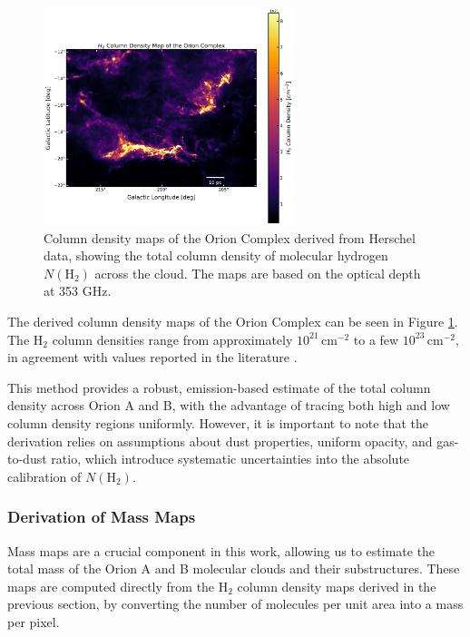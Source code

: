 \begin{figure}[t]
    \centering
    \includegraphics[width=0.65\textwidth]{figures/column_density_map.png}
    \caption{Column density maps of the Orion Complex derived from Herschel data, showing the total column density of molecular hydrogen $N(\mathrm{H}_2)$ across the cloud. The maps are based on the optical depth at 353 GHz.}
    \label{fig:n_h2_final_map}
\end{figure}

The derived column density maps of the Orion Complex can be seen in Figure \ref{fig:n_h2_final_map}. The $\mathrm{H}_2$ column densities range from approximately $10^{21}\,\mathrm{cm}^{-2}$ to a few $10^{23}\,\mathrm{cm}^{-2}$, 
in agreement with values reported in the literature \cite{lombardi2014herschel}.

This method provides a robust, emission-based estimate of the total column density across Orion A and B, with the advantage of tracing both high and low column density regions uniformly.
However, it is important to note that the derivation relies on assumptions about dust properties, uniform opacity, and gas-to-dust ratio, which introduce systematic uncertainties into the absolute calibration of $N(\mathrm{H}_2)$.

\subsubsection{Derivation of Mass Maps}

Mass maps are a crucial component in this work, allowing us to estimate the total mass of the Orion A and B molecular clouds and their substructures. These maps are computed directly from the H$_2$ column density maps derived in the previous section, by converting the number of molecules per unit area into a mass per pixel.

